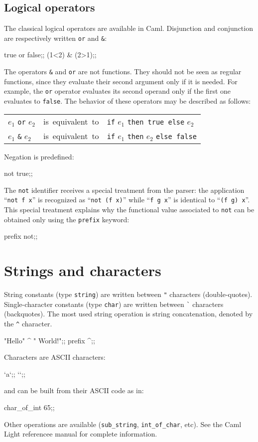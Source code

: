 \subsection{Logical operators}

The classical logical operators are available in Caml. Disjunction and
conjunction are respectively written {\tt or} and \verb|&|:
\begin{caml_example}
true or false;;
(1<2) & (2>1);;
\end{caml_example}
The operators \verb"&" and \verb"or" are not functions. They should
not be seen as regular functions, since they evaluate their second
argument only if it is needed. For example, the \verb"or" operator
evaluates its second operand only if the first one evaluates to
\verb"false".
The behavior of these operators may be described as follows:
\begin{center}
\begin{tabular}{lcl}
$e_1$ {\tt or} $e_2$ & \mbox{is equivalent to} &
                {\tt if} $e_1$ {\tt then true  else} $e_2$\\
$e_1$ \verb"&" $e_2$ & \mbox{is equivalent to} &
                {\tt if} $e_1$ {\tt then} $e_2$ {\tt else false}
\end{tabular}
\end{center}
Negation is predefined:
\begin{caml_example}
not true;;
\end{caml_example}
The \verb|not| identifier receives a special treatment from the
parser: the application ``{\tt not f x}'' is recognized as ``{\tt not
(f x)}'' while ``{\tt f g x}'' is identical to ``{\tt (f g) x}''. This
special treatment explains why the functional value associated to {\tt not}
can be obtained only using the {\tt prefix} keyword:
\begin{caml_example}
prefix not;;
\end{caml_example}

\section{Strings and characters}

String constants (type \verb"string") are written between \verb|"|
characters (double-quotes). Single-character constants (type
\verb"char") are written between \verb|`| characters (backquotes).
The most used string operation is string concatenation, denoted by the
\verb"^" character.
\begin{caml_example}
"Hello" ^ " World!";;
prefix ^;;
\end{caml_example}
Characters are ASCII characters:
\begin{caml_example}
`a`;;
``;;
\end{caml_example}
and can be built from their ASCII code as in:
\begin{caml_example}
char_of_int 65;;
\end{caml_example}
Other operations are available (\verb"sub_string", \verb|int_of_char|,
etc). See the Caml Light referencee manual \cite{CamlLightDoc} for
complete information.


